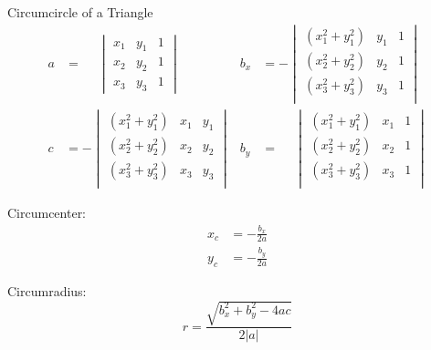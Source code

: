 \begin{frame}{Circumcircle of a Triangle}
	\begin{align*}
	a &= \phantom{-}\begin{vmatrix}
	x_1 & y_1 & 1 \\
	x_2 & y_2 & 1 \\
	x_3 & y_3 & 1
	\end{vmatrix} &
	b_x &= -\begin{vmatrix}
	\left( x_1^2 + y_1^2 \right) & y_1 & 1 \\
	\left( x_2^2 + y_2^2 \right) & y_2 & 1 \\
	\left( x_3^2 + y_3^2 \right) & y_3 & 1 \\
	\end{vmatrix} \\
	c &= -\begin{vmatrix}
	\left( x_1^2 + y_1^2 \right) & x_1 & y_1 \\
	\left( x_2^2 + y_2^2 \right) & x_2 & y_2 \\
	\left( x_3^2 + y_3^2 \right) & x_3 & y_3 \\
	\end{vmatrix} &
	b_y &= \phantom{-}\begin{vmatrix}
	\left( x_1^2 + y_1^2 \right) & x_1 & 1 \\
	\left( x_2^2 + y_2^2 \right) & x_2 & 1 \\
	\left( x_3^2 + y_3^2 \right) & x_3 & 1 \\
	\end{vmatrix}
	\end{align*}

\begin{minipage}[t]{0.45\linewidth}
	Circumcenter:
	\begin{align}
	x_c &= -\frac{b_x}{2 a} \\
	y_c &= -\frac{b_y}{2 a}
	\end{align}
\end{minipage}
\hfill
\begin{minipage}[t]{0.45\linewidth}
	Circumradius:
	\begin{equation}
	r = \frac{\sqrt{b_x^2 + b_y^2 - 4 a c}}{2 |a|}
	\end{equation}
\end{minipage}
\end{frame}


